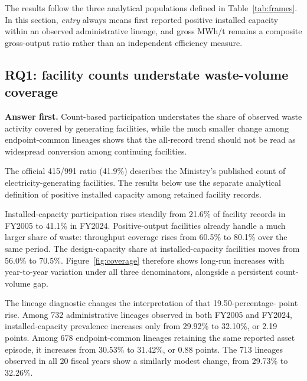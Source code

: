 \documentclass[12pt,letterpaper]{article}
\begin{document}
The results follow the three analytical populations defined in
Table~\ref{tab:frames}. In this section, \emph{entry} always means first reported
positive installed capacity within an observed administrative lineage, and
gross MWh/t remains a composite gross-output ratio rather than an independent
efficiency measure.

\subsection{RQ1: facility counts understate waste-volume coverage}

\noindent\textbf{Answer first.} Count-based participation understates the share
of observed waste activity covered by generating facilities, while the much
smaller change among endpoint-common lineages shows that the all-record trend
should not be read as widespread conversion among continuing facilities.

The official 415/991 ratio (41.9\%) describes the Ministry's published count of
electricity-generating facilities. The results below use the separate analytical
definition of positive installed capacity among retained facility records.

Installed-capacity participation rises steadily from 21.6\% of facility records
in FY2005 to 41.1\% in FY2024. Positive-output facilities already handle a much
larger share of waste: throughput coverage rises from 60.5\% to 80.1\% over the
same period. The design-capacity share at installed-capacity facilities moves
from 56.0\% to 70.5\%. Figure~\ref{fig:coverage} therefore shows long-run
increases with year-to-year variation under all three denominators, alongside a
persistent count-volume gap.

The lineage diagnostic changes the interpretation of that 19.50-percentage-
point rise. Among 732 administrative lineages observed in both FY2005 and
FY2024, installed-capacity prevalence increases only from 29.92\% to 32.10\%,
or 2.19 points. Among 678 endpoint-common lineages retaining the same reported
asset episode, it increases from 30.53\% to 31.42\%, or 0.88 points. The 713
lineages observed in all 20 fiscal years show a similarly modest change, from
29.73\% to 32.26\%.
\end{document}
